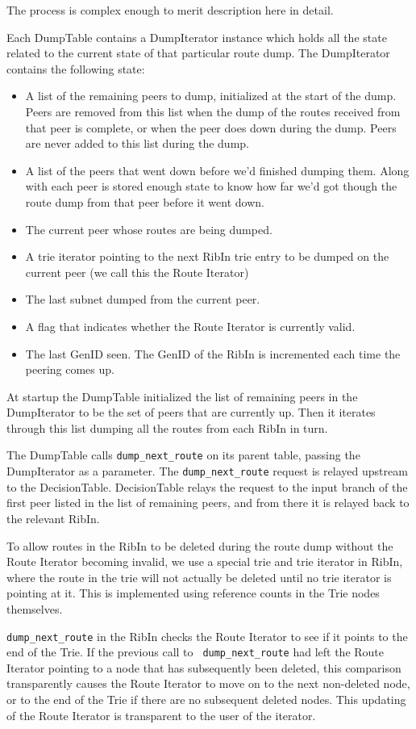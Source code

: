 \documentclass[11pt]{article}
\begin{document}
The process is complex enough to merit description here in detail.

Each DumpTable contains a DumpIterator instance which holds all the
state related to the current state of that particular route dump.  The
DumpIterator contains the following state:
\begin{itemize}
\item A list of the remaining peers to dump, initialized at the start
of the dump.  Peers are removed from this list when the dump of the
routes received from that peer is complete, or when the peer does down
during the dump.  Peers are never added to this list during the dump.
\item A list of the peers that went down before we'd finished dumping
them.  Along with each peer is stored enough state to know how far
we'd got though the route dump from that peer before it went down.
\item The current peer whose routes are being dumped.
\item A trie iterator pointing to the next RibIn trie entry to be dumped
on the current peer (we call this the Route Iterator)
\item The last subnet dumped from the current peer.
\item A flag that indicates whether the Route Iterator is currently
valid.
\item The last GenID seen.  The GenID of the RibIn is incremented each
time the peering comes up.
\end{itemize}
At startup the DumpTable initialized the list of remaining peers in
the DumpIterator to be the set of peers that are currently up.  Then
it iterates through this list dumping all the routes from each RibIn
in turn.

The DumpTable calls {\tt dump\_next\_route} on its parent table, passing the
DumpIterator as a parameter.  The {\tt dump\_next\_route} request is relayed
upstream to the DecisionTable.  DecisionTable relays the request to
the input branch of the first peer listed in the list of remaining
peers, and from there it is relayed back to the relevant RibIn.

To allow routes in the RibIn to be deleted during the route dump
without the Route Iterator becoming invalid, we use a special trie and
trie iterator in RibIn, where the route in the trie will not actually
be deleted until no trie iterator is pointing at it.  This is
implemented using reference counts in the Trie nodes themselves.

{\tt dump\_next\_route} in the RibIn checks the Route Iterator to see
if it points to the end of the Trie.  If the previous call to {\tt
dump\_next\_route} had left the Route Iterator pointing to a node that has
subsequently been deleted, this comparison transparently causes the
Route Iterator to move on to the next non-deleted node, or to the end
of the Trie if there are no subsequent deleted nodes.  This updating
of the Route Iterator is transparent to the user of the iterator.
\end{document}

